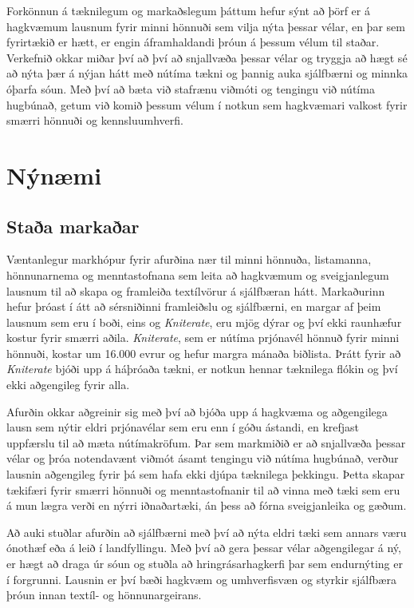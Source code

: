 \documentclass[a4paper,12pt,twoside]{article}
\begin{document}
Forkönnun á tæknilegum og markaðslegum þáttum hefur sýnt að þörf er á hagkvæmum lausnum fyrir minni hönnuði sem vilja nýta þessar vélar, en þar sem fyrirtækið er hætt, er engin áframhaldandi þróun á þessum vélum til staðar. Verkefnið okkar miðar því að því að snjallvæða þessar vélar og tryggja að hægt sé að nýta þær á nýjan hátt með nútíma tækni og þannig auka sjálfbærni og minnka óþarfa sóun. Með því að bæta við stafrænu viðmóti og tengingu við nútíma hugbúnað, getum við komið þessum vélum í notkun sem hagkvæmari valkost fyrir smærri hönnuði og kennsluumhverfi.

\section{Nýnæmi}
\subsection{Staða markaðar}
Væntanlegur markhópur fyrir afurðina nær til minni hönnuða, listamanna, hönnunarnema og menntastofnana sem leita að hagkvæmum og sveigjanlegum lausnum til að skapa og framleiða textílvörur á sjálfbæran hátt. Markaðurinn hefur þróast í átt að sérsniðinni framleiðslu og sjálfbærni, en margar af þeim lausnum sem eru í boði, eins og \textit{Kniterate}, eru mjög dýrar og því ekki raunhæfur kostur fyrir smærri aðila. \textit{Kniterate}, sem er nútíma prjónavél hönnuð fyrir minni hönnuði, kostar um 16.000 evrur og hefur margra mánaða biðlista. Þrátt fyrir að \textit{Kniterate} bjóði upp á háþróaða tækni, er notkun hennar tæknilega flókin og því ekki aðgengileg fyrir alla.

Afurðin okkar aðgreinir sig með því að bjóða upp á hagkvæma og aðgengilega lausn sem nýtir eldri prjónavélar sem eru enn í góðu ástandi, en krefjast uppfærslu til að mæta nútímakröfum. Þar sem markmiðið er að snjallvæða þessar vélar og þróa notendavænt viðmót ásamt tengingu við nútíma hugbúnað, verður lausnin aðgengileg fyrir þá sem hafa ekki djúpa tæknilega þekkingu. Þetta skapar tækifæri fyrir smærri hönnuði og menntastofnanir til að vinna með tæki sem eru á mun lægra verði en nýrri iðnaðartæki, án þess að fórna sveigjanleika og gæðum. 

Að auki stuðlar afurðin að sjálfbærni með því að nýta eldri tæki sem annars væru ónothæf eða á leið í landfyllingu. Með því að gera þessar vélar aðgengilegar á ný, er hægt að draga úr sóun og stuðla að hringrásarhagkerfi þar sem endurnýting er í forgrunni. Lausnin er því bæði hagkvæm og umhverfisvæn og styrkir sjálfbæra þróun innan textíl- og hönnunargeirans.
\end{document}
